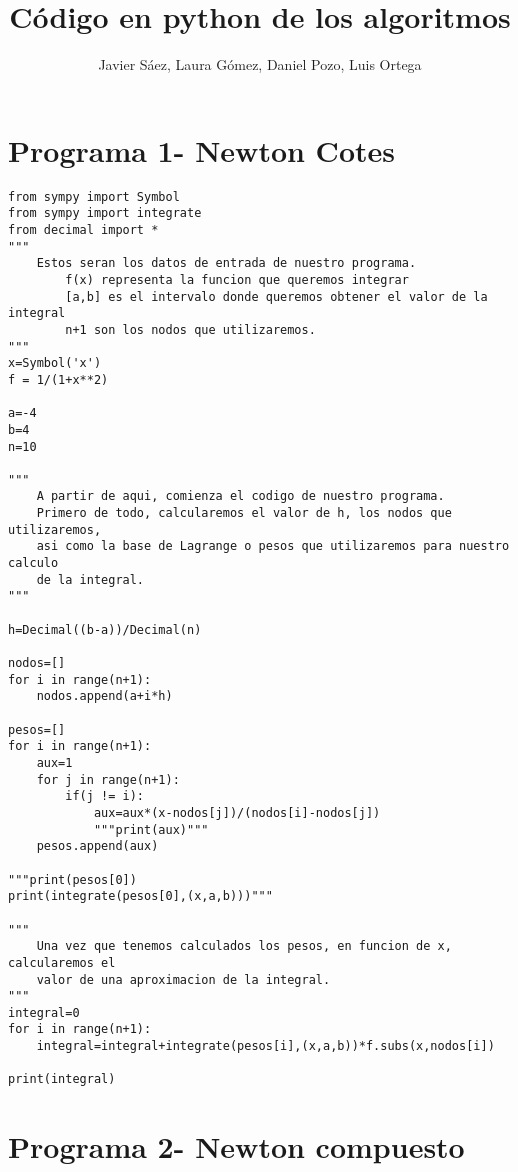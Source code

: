 \documentclass[11pt]{article}
\title{\textbf{Código en python de los algoritmos}}
\author{Javier Sáez, Laura Gómez, Daniel Pozo, Luis Ortega}
\date{}
\begin{document}
\maketitle

\section{Programa 1- Newton Cotes}

\begin{lstlisting}
from sympy import Symbol
from sympy import integrate
from decimal import *
"""
    Estos seran los datos de entrada de nuestro programa.
        f(x) representa la funcion que queremos integrar
        [a,b] es el intervalo donde queremos obtener el valor de la integral
        n+1 son los nodos que utilizaremos.
"""
x=Symbol('x')
f = 1/(1+x**2)

a=-4
b=4
n=10

"""
    A partir de aqui, comienza el codigo de nuestro programa.
    Primero de todo, calcularemos el valor de h, los nodos que utilizaremos,
    asi como la base de Lagrange o pesos que utilizaremos para nuestro calculo
    de la integral.
"""

h=Decimal((b-a))/Decimal(n)

nodos=[]
for i in range(n+1):
    nodos.append(a+i*h)

pesos=[]
for i in range(n+1):
    aux=1
    for j in range(n+1):
        if(j != i):
            aux=aux*(x-nodos[j])/(nodos[i]-nodos[j])
            """print(aux)"""
    pesos.append(aux)

"""print(pesos[0])
print(integrate(pesos[0],(x,a,b)))"""

"""
    Una vez que tenemos calculados los pesos, en funcion de x, calcularemos el
    valor de una aproximacion de la integral.
"""
integral=0
for i in range(n+1):
    integral=integral+integrate(pesos[i],(x,a,b))*f.subs(x,nodos[i])

print(integral)
\end{lstlisting}

\section{Programa 2- Newton compuesto}
\end{document}
